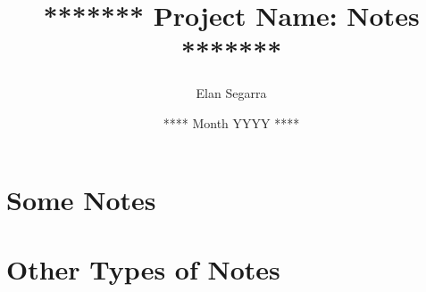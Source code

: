 \documentclass[11pt, letterpaper]{article}
\begin{document}
\title{******* Project Name: Notes *******}
\author{Elan Segarra}
\date{**** Month YYYY ****}
\maketitle

\section{Some Notes}

\lipsum[1-5]

\section{Other Types of Notes}

\lipsum[1-5]
\end{document}
